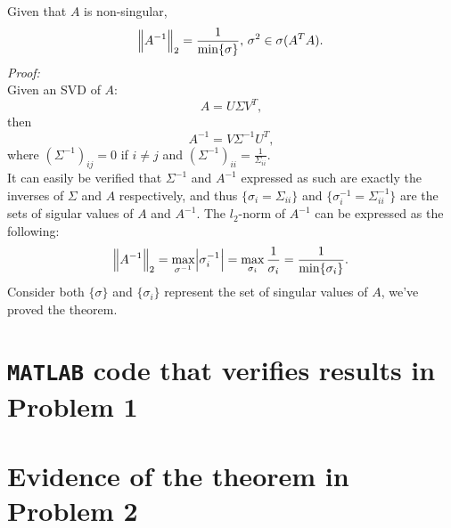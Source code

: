 \documentclass[11pt]{article}
\begin{document}
\subsection{}
Given that $A$ is non-singular, 
$$\norm{A^{-1}}_2 =\frac1{\min\{\sigma\}},\,\sigma^2\in\sigma(A^TA).$$
\textit{Proof:}\\[0.3cm]
Given an SVD of $A$:
$$A = U\Sigma V^T,$$ then
$$A^{-1} = V\Sigma^{-1}U^T,$$
where $(\Sigma^{-1})_{ij} = 0$ if $i\neq j$ and $(\Sigma^{-1})_{ii} = \frac1{\Sigma_{ii}}$.\\[0.3cm]
It can easily be verified that $\Sigma^{-1}$ and $A^{-1}$ expressed as such are exactly the inverses of $\Sigma$ and $A$ respectively, and thus $\{\sigma_i = \Sigma_{ii}\}$ and $\{\sigma^{-1}_i = \Sigma^{-1}_{ii}\}$ are the sets of sigular values of $A$ and $A^{-1}$. The $l_2$-norm of $A^{-1}$ can be expressed as the following:
$$\norm{A^{-1}}_2 = \max_{\sigma^{-1}}{\abs{\sigma^{-1}_i}} = \max_{\sigma_i}\frac1{\sigma_i}=\frac1{\min\{\sigma_i\}}.$$
Consider both $\{\sigma\}$ and $\{\sigma_i\}$ represent the set of singular values of $A$, we've proved the theorem.


\newpage
\appendix{}
\section{\texttt{MATLAB} code that verifies results in Problem 1}

\section{Evidence of the theorem in Problem 2}
\end{document}

